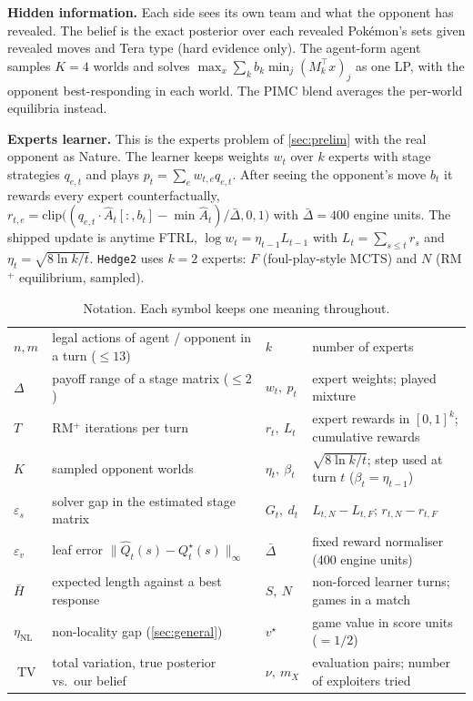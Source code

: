 \documentclass[10pt]{article}
\theoremstyle{plain}
\theoremstyle{definition}
\theoremstyle{remark}
\newcommand{\Hbar}{\bar H}
\newcommand{\epss}{\varepsilon_s}
\newcommand{\epsv}{\varepsilon_v}
\newcommand{\etaNL}{\eta_{\mathrm{NL}}}
\newcommand{\Ahat}{\hat A}
\newcommand{\Qhat}{\hat Q}
\newcommand{\Qstar}{Q^\star}
\newcommand{\Dbar}{\bar\Delta}
\DeclareMathOperator{\TV}{TV}
\begin{document}
\textbf{Hidden information.} Each side sees its own team and what the opponent has revealed. The belief is the exact posterior over each revealed Pok\'emon's sets given revealed moves and Tera type (hard evidence only). The agent-form agent samples $K=4$ worlds and solves $\max_x\sum_k b_k\min_j(M_k^\top x)_j$ as one LP, with the opponent best-responding in each world. The PIMC blend averages the per-world equilibria instead.

\textbf{Experts learner.} This is the experts problem of \cref{sec:prelim} with the real opponent as Nature. The learner keeps weights $w_t$ over $k$ experts with stage strategies $q_{e,t}$ and plays $p_t=\sum_e w_{t,e}q_{e,t}$. After seeing the opponent's move $b_t$ it rewards every expert counterfactually,
$r_{t,e}=\mathrm{clip}\big((q_{e,t}\cdot\Ahat_t[:,b_t]-\min\Ahat_t)/\Dbar,0,1\big)$ with $\Dbar=400$ engine units. The shipped update is anytime FTRL, $\log w_t=\eta_{t-1}L_{t-1}$ with $L_t=\sum_{s\le t}r_s$ and $\eta_t=\sqrt{8\ln k/t}$. \texttt{Hedge2} uses $k=2$ experts: $F$ (foul-play-style MCTS) and $N$ (RM$^+$ equilibrium, sampled).

\begin{table}[t]
\centering\small
\caption{Notation. Each symbol keeps one meaning throughout.}
\label{tab:notation}
\begin{tabular}{@{}ll@{\qquad}ll@{}}
\toprule
$n,m$ & legal actions of agent / opponent in a turn ($\le13$) & $k$ & number of experts \\
$\Delta$ & payoff range of a stage matrix ($\le2$) & $w_t,\ p_t$ & expert weights; played mixture \\
$T$ & RM$^+$ iterations per turn & $r_t,\ L_t$ & expert rewards in $[0,1]^k$; cumulative rewards \\
$K$ & sampled opponent worlds & $\eta_t,\ \beta_t$ & $\sqrt{8\ln k/t}$; step used at turn $t$ ($\beta_t=\eta_{t-1}$) \\
$\epss$ & solver gap in the estimated stage matrix & $G_t,\ d_t$ & $L_{t,N}-L_{t,F}$; $r_{t,N}-r_{t,F}$ \\
$\epsv$ & leaf error $\lVert\Qhat_t(s)-\Qstar_t(s)\rVert_\infty$ & $\Dbar$ & fixed reward normaliser (400 engine units) \\
$\Hbar$ & expected length against a best response & $S,\ N$ & non-forced learner turns; games in a match \\
$\etaNL$ & non-locality gap (\cref{sec:general}) & $v^\star$ & game value in score units ($=1/2$) \\
$\TV$ & total variation, true posterior vs.\ our belief & $\nu,\ m_X$ & evaluation pairs; number of exploiters tried \\
\bottomrule
\end{tabular}
\vspace{-0.6em}
\end{table}
\end{document}
